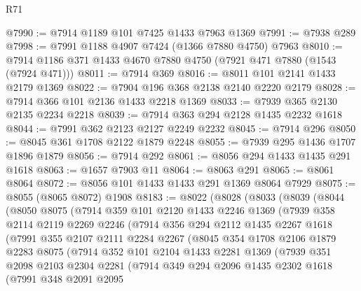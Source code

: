 \begin{lexlean}{R71}
\begin{coremodule}
@7990 := @7914 @1189 @101 @7425 @1433 @7963 @1369
@7991 := @7938 @289
@7998 := @7991 @1188 @4907 @7424 (@1366 @7880 @4750) @7963
@8010 := @7914 @1186 @371 @1433 @4670 @7880 @4750 (@7921 @471 @7880 (@1543 (@7924 @471)))
@8011 := @7914 @369
@8016 := @8011 @101 @2141 @1433 @2179 @1369
@8022 := @7904 @196 @368 @2138 @2140 @2220 @2179
@8028 := @7914 @366 @101 @2136 @1433 @2218 @1369
@8033 := @7939 @365 @2130 @2135 @2234 @2218
@8039 := @7914 @363 @294 @2128 @1435 @2232 @1618
@8044 := @7991 @362 @2123 @2127 @2249 @2232
@8045 := @7914 @296
@8050 := @8045 @361 @1708 @2122 @1879 @2248
@8055 := @7939 @295 @1436 @1707 @1896 @1879
@8056 := @7914 @292
@8061 := @8056 @294 @1433 @1435 @291 @1618
@8063 := @1657 @7903 @11
@8064 := @8063 @291
@8065 := @8061 @8064
@8072 := @8056 @101 @1433 @1433 @291 @1369 @8064 @7929
@8075 := @8055 (@8065 @8072) @1908
@8183 := @8022
    (@8028
      (@8033
        (@8039
          (@8044
            (@8050
              @8075
              (@7914
                @359
                @101
                @2120
                @1433
                @2246
                @1369
                (@7939
                  @358
                  @2114
                  @2119
                  @2269
                  @2246
                  (@7914
                    @356
                    @294
                    @2112
                    @1435
                    @2267
                    @1618
                    (@7991
                      @355
                      @2107
                      @2111
                      @2284
                      @2267
                      (@8045
                        @354
                        @1708
                        @2106
                        @1879
                        @2283
                        @8075
                        (@7914
                          @352
                          @101
                          @2104
                          @1433
                          @2281
                          @1369
                          (@7939
                            @351
                            @2098
                            @2103
                            @2304
                            @2281
                            (@7914
                              @349
                              @294
                              @2096
                              @1435
                              @2302
                              @1618
                              (@7991
                                @348
                                @2091
                                @2095

\end{coremodule}
\end{lexlean}
